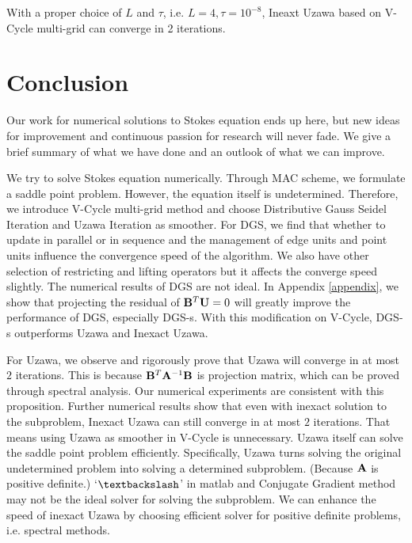 \documentclass[english]{pkupaper}
\begin{document}
With a proper choice of $L$ and $\tau$, i.e. $L=4, \tau=10^{-8}$, Ineaxt Uzawa based on V-Cycle multi-grid can converge in 2 iterations.

\section{Conclusion}
Our work for numerical solutions to Stokes equation ends up here, but new ideas for improvement and continuous passion for research will never fade. We give a brief summary of what we have done and an outlook of what we can improve.

We try to solve Stokes equation numerically. Through MAC scheme, we formulate a saddle point problem. However, the equation itself is undetermined. Therefore, we introduce V-Cycle multi-grid method and choose Distributive Gauss Seidel Iteration and Uzawa Iteration as smoother. For DGS, we find that whether to update in parallel or in sequence and the management of edge units and point units influence the convergence speed of the algorithm. We also have other selection of restricting and lifting operators but it affects the converge speed slightly. The numerical results of DGS are not ideal. In Appendix \ref{appendix}, we show that projecting the residual of $\mathbf{B}^T\mathbf{U}=0$ will greatly improve the performance of DGS, especially DGS-s. With this modification on V-Cycle, DGS-s outperforms Uzawa and Inexact Uzawa.

For Uzawa, we observe and rigorously prove that Uzawa will converge in at most $2$ iterations. This is because $\mathbf{B}^T\mathbf{A}^{-1}\mathbf{B}$ is projection matrix, which can be proved through spectral analysis. Our numerical experiments are consistent with this proposition. Further numerical results show that even with inexact solution to the subproblem, Inexact Uzawa can still converge in at most $2$ iterations. That means using Uzawa as smoother in V-Cycle is unnecessary. Uzawa itself can solve the saddle point problem efficiently. Specifically, Uzawa turns solving the original undetermined problem into solving a determined subproblem. (Because $\mathbf{A}$ is positive definite.) `$\textbackslash$' in matlab and Conjugate Gradient method may not be the ideal solver for solving the subproblem. We can enhance the speed of inexact Uzawa by choosing efficient solver for positive definite problems, i.e. spectral methods. 


\appendix
\end{document}
